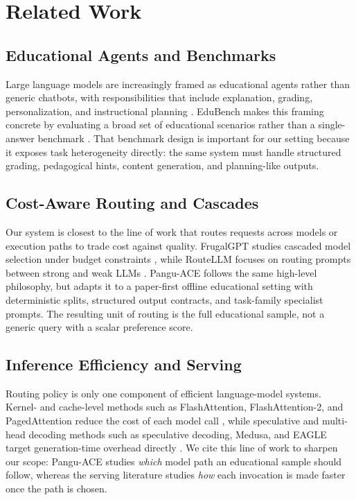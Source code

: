 \documentclass{article}
\begin{document}
\section{Related Work}
\subsection{Educational Agents and Benchmarks}
Large language models are increasingly framed as educational agents rather than generic chatbots, with responsibilities that include explanation, grading, personalization, and instructional planning \cite{xu2024large, agent_survey}. EduBench makes this framing concrete by evaluating a broad set of educational scenarios rather than a single-answer benchmark \cite{edubench}. That benchmark design is important for our setting because it exposes task heterogeneity directly: the same system must handle structured grading, pedagogical hints, content generation, and planning-like outputs.

\subsection{Cost-Aware Routing and Cascades}
Our system is closest to the line of work that routes requests across models or execution paths to trade cost against quality. FrugalGPT studies cascaded model selection under budget constraints \cite{frugalgpt}, while RouteLLM focuses on routing prompts between strong and weak LLMs \cite{routellm}. Pangu-ACE follows the same high-level philosophy, but adapts it to a paper-first offline educational setting with deterministic splits, structured output contracts, and task-family specialist prompts. The resulting unit of routing is the full educational sample, not a generic query with a scalar preference score.

\subsection{Inference Efficiency and Serving}
Routing policy is only one component of efficient language-model systems. Kernel- and cache-level methods such as FlashAttention, FlashAttention-2, and PagedAttention reduce the cost of each model call \cite{flashattention, flashattention2, pagedattention}, while speculative and multi-head decoding methods such as speculative decoding, Medusa, and EAGLE target generation-time overhead directly \cite{speculative_decoding, medusa, eagle}. We cite this line of work to sharpen our scope: Pangu-ACE studies \emph{which} model path an educational sample should follow, whereas the serving literature studies \emph{how} each invocation is made faster once the path is chosen.
\end{document}
